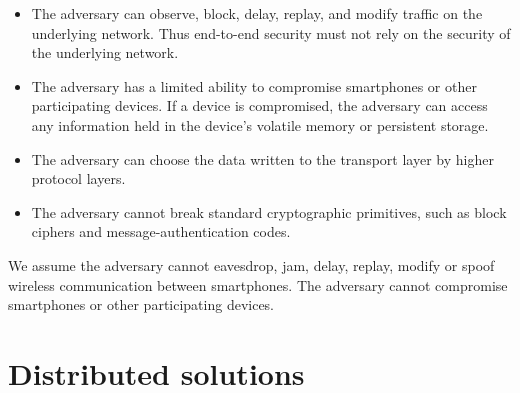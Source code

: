 \begin{itemize}
\item{
	The adversary can observe, block, delay, replay, and modify traffic on the underlying network.
	Thus end-to-end security must not rely on the security of the underlying network.
}
\item{
	The adversary has a limited ability to compromise smartphones or other participating devices.
	If a device is compromised, the adversary can access any information held in the device's volatile memory or persistent storage.
}
\item{
	The adversary can choose the data written to the transport layer by higher protocol layers.
}
\item{
	The adversary cannot break standard cryptographic primitives, such as block ciphers and message-authentication codes.
}
\end{itemize}
We assume the adversary cannot eavesdrop, jam, delay, replay, modify or spoof wireless communication between smartphones.
The adversary cannot compromise smartphones or other participating devices.

\section{Distributed solutions}\label{sec:distributed_solutions}

